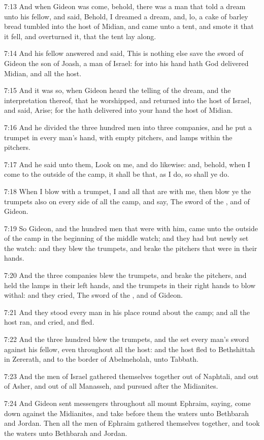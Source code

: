 7:13 And when Gideon was come, behold, there was a man that told a
dream unto his fellow, and said, Behold, I dreamed a dream, and, lo, a
cake of barley bread tumbled into the host of Midian, and came unto a
tent, and smote it that it fell, and overturned it, that the tent lay
along.

7:14 And his fellow answered and said, This is nothing else save the
sword of Gideon the son of Joash, a man of Israel: for into his hand
hath God delivered Midian, and all the host.

7:15 And it was so, when Gideon heard the telling of the dream, and
the interpretation thereof, that he worshipped, and returned into the
host of Israel, and said, Arise; for the \LORD hath delivered into your
hand the host of Midian.

7:16 And he divided the three hundred men into three companies, and he
put a trumpet in every man's hand, with empty pitchers, and lamps
within the pitchers.

7:17 And he said unto them, Look on me, and do likewise: and, behold,
when I come to the outside of the camp, it shall be that, as I do, so
shall ye do.

7:18 When I blow with a trumpet, I and all that are with me, then blow
ye the trumpets also on every side of all the camp, and say, The sword
of the \LORD, and of Gideon.

7:19 So Gideon, and the hundred men that were with him, came unto the
outside of the camp in the beginning of the middle watch; and they had
but newly set the watch: and they blew the trumpets, and brake the
pitchers that were in their hands.

7:20 And the three companies blew the trumpets, and brake the
pitchers, and held the lamps in their left hands, and the trumpets in
their right hands to blow withal: and they cried, The sword of the
\LORD, and of Gideon.

7:21 And they stood every man in his place round about the camp; and
all the host ran, and cried, and fled.

7:22 And the three hundred blew the trumpets, and the \LORD set every
man's sword against his fellow, even throughout all the host: and the
host fled to Bethshittah in Zererath, and to the border of
Abelmeholah, unto Tabbath.

7:23 And the men of Israel gathered themselves together out of
Naphtali, and out of Asher, and out of all Manasseh, and pursued after
the Midianites.

7:24 And Gideon sent messengers throughout all mount Ephraim, saying,
come down against the Midianites, and take before them the waters unto
Bethbarah and Jordan. Then all the men of Ephraim gathered themselves
together, and took the waters unto Bethbarah and Jordan.

